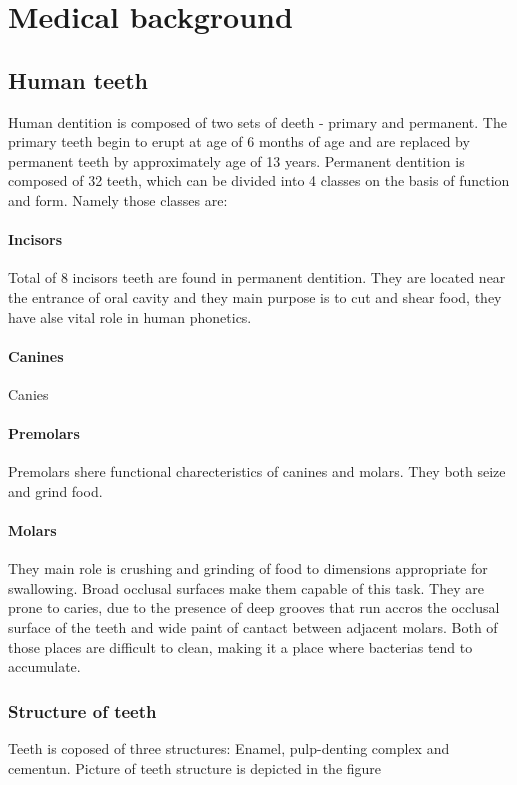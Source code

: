 \chapter{Medical background}

\section{Human teeth}
Human dentition is composed of two sets of deeth - primary and permanent. The primary teeth begin to erupt at age of 6 months of age and are replaced by permanent teeth by approximately age of 13 years. Permanent dentition is composed of 32 teeth, which can be divided into 4 classes on the basis of function and form. Namely those classes are:

\subsubsection*{Incisors}
Total of 8 incisors teeth are found in permanent dentition. They are located near the entrance of oral cavity and they main purpose is to cut and shear food, they have alse vital role in human phonetics.

\subsubsection*{Canines}
Canies

\subsubsection*{Premolars}
Premolars shere functional charecteristics of canines and molars. They both seize and grind food.

\subsubsection*{Molars}
They main role is  crushing and grinding of food to dimensions appropriate for swallowing. Broad occlusal surfaces make them capable of this task. They are prone to caries, due to the presence of deep grooves that run accros the occlusal surface of the teeth and wide paint of cantact between adjacent molars. Both of those places are difficult to clean, making it a place where bacterias tend to accumulate.


\subsection{Structure of teeth}
Teeth is coposed of three structures: Enamel, pulp-denting complex and cementun. Picture of teeth structure is depicted in the figure

